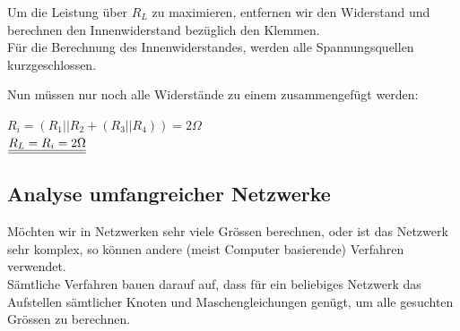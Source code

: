 \beginbsp
Um die Leistung über $R_L$ zu maximieren, entfernen wir den Widerstand und berechnen den Innenwiderstand bezüglich den Klemmen. \\
Für die Berechnung des Innenwiderstandes, werden alle Spannungsquellen kurzgeschlossen.
\begin{center}
\end{center}
Nun müssen nur noch alle Widerstände zu einem zusammengefügt werden:
\begin{center}
	$R_i = (R_1 || R_2 + (R_3 || R_4 )) = 2 \Omega$ \\
	$\underline{\underline{ R_L = R_i = 2 \Omega}}$
\end{center}
\iend










										 \newpage





					          \subsection{Analyse umfangreicher Netzwerke}

					           Möchten wir in Netzwerken sehr viele Grössen berechnen, oder ist das Netzwerk sehr komplex, so können andere (meist Computer basierende) Verfahren verwendet. \\
					           Sämtliche Verfahren bauen darauf auf, dass für ein beliebiges Netzwerk das Aufstellen sämtlicher Knoten und Maschengleichungen genügt, um alle gesuchten Grössen zu berechnen. \\

